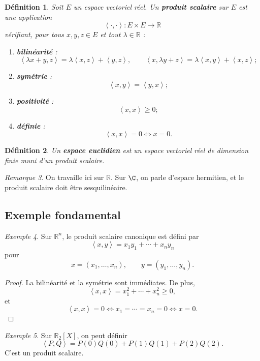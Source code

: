 \documentclass[11pt,a4paper]{article}
\newtheorem{definition}{Définition}[section]
\theoremstyle{remark}
\newtheorem{remarque}[definition]{Remarque}
\newtheorem{exemple}[definition]{Exemple}
\newcommand{\R}{\mathbb{R}}
\newcommand{\scal}[2]{\left\langle #1,#2\right\rangle}
\begin{document}
\begin{definition}
Soit \(E\) un espace vectoriel réel.  
Un \textbf{produit scalaire} sur \(E\) est une application
\[
\scal{\cdot}{\cdot}:E\times E\to \R
\]
vérifiant, pour tous \(x,y,z\in E\) et tout \(\lambda\in\R\) :
\begin{enumerate}[label=\arabic*)]
    \item \textbf{bilinéarité} :
    \[
    \scal{\lambda x+y}{z}=\lambda \scal{x}{z}+\scal{y}{z},
    \qquad
    \scal{x}{\lambda y+z}=\lambda \scal{x}{y}+\scal{x}{z} ;
    \]
    \item \textbf{symétrie} :
    \[
    \scal{x}{y}=\scal{y}{x} ;
    \]
    \item \textbf{positivité} :
    \[
    \scal{x}{x}\ge 0 ;
    \]
    \item \textbf{définie} :
    \[
    \scal{x}{x}=0 \Longleftrightarrow x=0.
    \]
\end{enumerate}
\end{definition}

\begin{definition}
Un \textbf{espace euclidien} est un espace vectoriel réel de dimension finie muni d’un produit scalaire.
\end{definition}

\begin{remarque}
On travaille ici sur \(\R\). Sur \(\C\), on parle d’espace hermitien, et le produit scalaire doit être sesquilinéaire.
\end{remarque}

\subsection{Exemple fondamental}

\begin{exemple}
Sur \(\R^n\), le produit scalaire canonique est défini par
\[
\scal{x}{y}=x_1y_1+\cdots+x_ny_n
\]
pour
\[
x=(x_1,\dots,x_n),\qquad y=(y_1,\dots,y_n).
\]
\end{exemple}

\begin{proof}
La bilinéarité et la symétrie sont immédiates. De plus,
\[
\scal{x}{x}=x_1^2+\cdots+x_n^2\ge 0,
\]
et
\[
\scal{x}{x}=0
\Longleftrightarrow
x_1=\cdots=x_n=0
\Longleftrightarrow
x=0.
\]
\end{proof}

\begin{exemple}
Sur \(\R_2[X]\), on peut définir
\[
\scal{P}{Q}=P(0)Q(0)+P(1)Q(1)+P(2)Q(2).
\]
C’est un produit scalaire.
\end{exemple}
\end{document}
